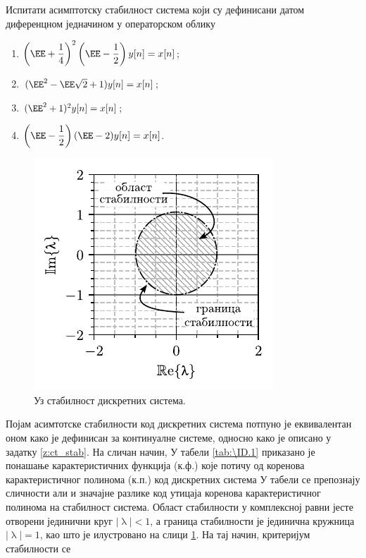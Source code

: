\PID \mnImportant
Испитати асимптотску стабилност система који су дефинисани датом диференцном једначином у операторском облику
\begin{multicols}{2}
    \begin{enumerate}[label=(\alph*)]
    \item $ \left(\EE + \dfrac14 \right)^2\left(\EE - \dfrac12 \right)y[n] = x[n]$;
    \item $(\EE^2 - \EE \sqrt2 + 1) y[n] = x[n]$;
    \item $(\EE^2 + 1)^2 y[n] = x[n]$;
    \item $\left(\EE - \dfrac12 \right)(\EE - 2) y[n] = x[n]$.
    \end{enumerate}
\end{multicols} \noindent

\RESENJE 
%
\begin{figure}[b!]
    \centering
    \includegraphics{fig/stab_edit.pdf}
    \caption{Уз стабилност дискретних система.}
    \label{fig:\ID.stab}
\end{figure}
%
Појам асимтотске стабилности код дискретних система потпуно је еквивалентан оном како је дефинисан 
за континуалне системе, односно како је описано у задатку \ref{z:ct_stab}. На сличан начин, 
У табели \ref{tab:\ID.1} приказано је понашање карактеристичних функција (к.ф.) које потичу од коренова карактеристичног 
полинома (к.п.) код дискретних система 
%
У табели се препознају сличности али и значајне разлике код утицаја коренова карактеристичног полинома 
на стабилност система. Област стабилности у комплексној равни јесте отворени јединични круг $|\uplambda| < 1$, 
а граница стабилности је јединична кружница $|\uplambda| = 1$, као што је илустровано на слици
\ref{fig:\ID.stab}. На тај начин, критеријум стабилности се 
